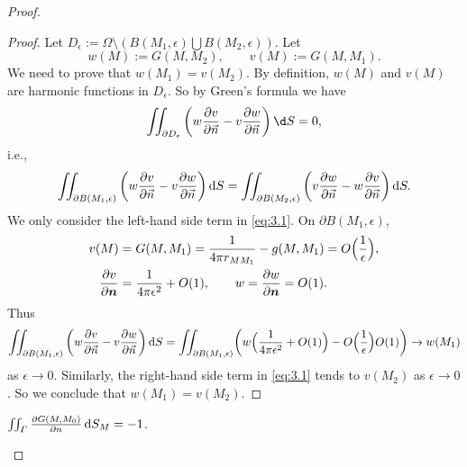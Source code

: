 \begin{proof}
  \begin{proof}
    Let $D_{\epsilon}:=\varOmega\setminus(B(M_1,\epsilon)\bigcup B(M_2,\epsilon))$.
    Let
    \[ w(M):=G(M,M_2), \qquad v(M):=G(M,M_1). \]
    We need to prove that $w(M_1)=v(M_2)$.
    By definition, $w(M)$ and $v(M)$ are harmonic functions in $D_{\epsilon}$.
    So by Green's formula we have
    \[ \iint_{\partial D_{\epsilon}}\left(w\frac{\partial v}{\partial\vec{n}}
      -v\frac{\partial w}{\partial\vec{n}}\right)\d S = 0, \]
    i.e.,
    \begin{equation}\label{eq:3.1}
      \iint_{\partial B(M_1,\epsilon)}
      \left(w\frac{\partial v}{\partial\vec{n}}-v\frac{\partial w}{\partial\vec{n}}\right)\mathop{}\!\mathrm{d} S
      = \iint_{\partial B(M_2,\epsilon)}
        \left(v\frac{\partial w}{\partial\vec{n}}-w\frac{\partial v}{\partial\vec{n}}\right)\mathop{}\!\mathrm{d} S.
    \end{equation}
    We only consider the left-hand side term in \eqref{eq:3.1}.
    On $\partial B(M_1,\epsilon)$,
    \begin{align*}
      v(M) & = G(M,M_1) = \frac{1}{4\pi r_{MM_1}} -g(M,M_1) = O\Bigl(\frac{1}{\epsilon}\Bigr), \\
      \frac{\partial v}{\partial\bm{n}} & = \frac{1}{4\pi\epsilon^2} + O(1), \qquad
      w = \frac{\partial w}{\partial\bm{n}} = O(1).
    \end{align*}
    Thus
    \[ \iint_{\partial B(M_1,\epsilon)}
      \left(w\frac{\partial v}{\partial\vec{n}}-v\frac{\partial w}{\partial\vec{n}}\right)\mathop{}\!\mathrm{d} S
      = \iint_{\partial B(M_1,\epsilon)} \biggl(w\Bigl(\frac{1}{4\pi\epsilon^2} + O(1)\Bigr)
          - O\Bigl(\frac{1}{\epsilon}\Bigr)O(1)\biggr)
      \to w(M_1)\]
    as $\epsilon\to 0$. Similarly, the right-hand side term in \eqref{eq:3.1}
    tends to $v(M_2)$ as $\epsilon\to 0$. So we conclude that $w(M_1)=v(M_2)$.
  \end{proof}

  \begin{property}
    $\iint_{\varGamma} \frac{\partial G(M, M_0)}{\partial n} \mathop{}\!\mathrm{d} S_M = -1$.

  \end{property}
  

\end{proof}
